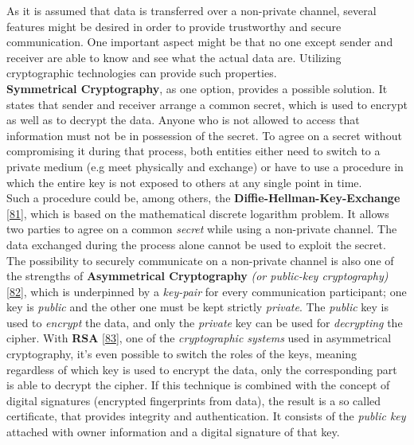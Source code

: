 \documentclass[12pt,english,a4paper,titlepage,cleardoublepage=empty,dottedtoc]{report}
\begin{document}
As it is assumed that data is transferred over a non-private channel,
several features might be desired in order to provide trustworthy and
secure communication. One important aspect might be that no one except
sender and receiver are able to know and see what the actual data are.
Utilizing cryptographic technologies can provide such properties.\\
\textbf{Symmetrical Cryptography}, as one option, provides a possible
solution. It states that sender and receiver arrange a common secret,
which is used to encrypt as well as to decrypt the data. Anyone who is
not allowed to access that information must not be in possession of the
secret. To agree on a secret without compromising it during that
process, both entities either need to switch to a private medium (e.g
meet physically and exchange) or have to use a procedure in which the
entire key is not exposed to others at any single point in time.\\
Such a procedure could be, among others, the
\textbf{Diffie-Hellman-Key-Exchange}
{[}\protect\hyperlink{ref-paper_1976_d-h-key-exchange}{81}{]}, which is
based on the mathematical discrete logarithm problem. It allows two
parties to agree on a common \emph{secret} while using a non-private
channel. The data exchanged during the process alone cannot be used to
exploit the secret.\\
The possibility to securely communicate on a non-private channel is also
one of the strengths of
\textbf{\protect\hypertarget{def--asym-crypto}{}{Asymmetrical
Cryptography}} \emph{(or public-key cryptography)}
{[}\protect\hyperlink{ref-book_2014_chapter-9-1-public-key-crypto}{82}{]},
which is underpinned by a \emph{key-pair} for every communication
participant; one key is \emph{public} and the other one must be kept
strictly \emph{private}. The \emph{public} key is used to \emph{encrypt}
the data, and only the \emph{private} key can be used for
\emph{decrypting} the cipher. With \textbf{RSA}
{[}\protect\hyperlink{ref-web_spec_rsa}{83}{]}, one of the
\emph{cryptographic systems} used in asymmetrical cryptography, it's
even possible to switch the roles of the keys, meaning regardless of
which key is used to encrypt the data, only the corresponding part is
able to decrypt the cipher. If this technique is combined with the
concept of digital signatures (encrypted fingerprints from data), the
result is a so called certificate, that provides integrity and
authentication. It consists of the \emph{public key} attached with owner
information and a digital signature of that key.
\end{document}
